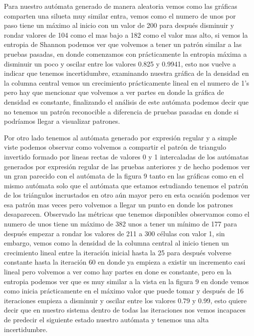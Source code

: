 \documentclass[11pt]{article}
\begin{document}
		 Para nuestro autómata generado de manera aleatoria vemos como las gráficas comparten una silueta muy similar entra, vemos como el numero de unos por paso tiene un máximo al inicio con un valor de 200 para después disminuir y rondar valores de 104 como el mas bajo a 182 como el valor mas alto, si vemos la entropia de Shannon podemos ver que volvemos a tener un patrón similar a las pruebas pasadas, en donde comenzamos con prácticamente la entropia máxima a disminuir un poco y oscilar entre los valores 0.825 y 0.9941, esto nos vuelve a indicar que tenemos incertidumbre, examinando nuestra gráfica de la densidad en la columna central vemos un crecimiento prácticamente lineal en el numero de 1's pero hay que mencionar que volvemos a ver partes en donde la gráfica de densidad es constante, finalizando el análisis de este autómata podemos decir que no tenemos un patrón reconocible a diferencia de pruebas pasadas en donde si podríamos llegar a visualizar patrones.\par
		 Por otro lado tenemos al autómata generado por expresión regular y a simple viste podemos observar como volvemos a compartir el patrón de triangulo invertido formado por lineas rectas de valores 0 y 1 intercaladas de los autómatas generados por expresión regular de las pruebas anteriores y de hecho podemos ver un gran parecido con el autómata de la figura 9 tanto en las gráficas como en el mismo autómata solo que el autómata que estamos estudiando tenemos el patrón de los triángulos incrustados en otro aún mayor pero en esta ocasión podemos ver esa patrón mas veces pero volvemos a llegar un punto en donde los  patrones desaparecen. Observado las métricas que tenemos disponibles observamos como el numero de unos tiene un máximo de 382 unos a tener un mínimo de 177 para después empezar a rondar los valores de 211 a 300 células con valor 1, sin embargo, vemos como la densidad de la columna central al inicio tienen un crecimiento lineal entre la iteración inicial hasta la 25 para después volverse constante hasta la iteración 60 en donde ya empieza a existir un incremento casi lineal pero volvemos a ver como hay partes en done es constante, pero en la entropia podemos ver que es muy similar a la vista en la figura 9 en donde vemos como inicia prácticamente en el máximo valor que puede tomar y después de 16 iteraciones empieza a disminuir y oscilar entre los valores 0.79 y 0.99, esto quiere decir que en nuestro sistema dentro de todas las iteraciones nos vemos incapaces de predecir el siguiente estado nuestro autómata y tenemos una alta incertidumbre.\par
\end{document}
